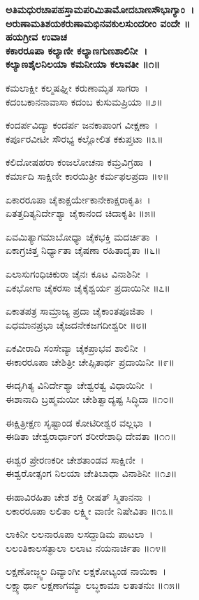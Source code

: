 {\bfseries ಅತಿಮಧುರಚಾಪಹಸ್ತಾಮಪರಿಮಿತಾಮೋದಬಾಣಸೌಭಾಗ್ಯಾಂ~।\\
ಅರುಣಾಮತಿಶಯಕರುಣಾಮಭಿನವಕುಲಸುಂದರೀಂ ವಂದೇ ॥\\
ಹಯಗ್ರೀವ ಉವಾಚ\\
ಕಕಾರರೂಪಾ ಕಲ್ಯಾಣೀ ಕಲ್ಯಾಣಗುಣಶಾಲಿನೀ~।\\
ಕಲ್ಯಾಣಶೈಲನಿಲಯಾ ಕಮನೀಯಾ ಕಲಾವತೀ ॥೧॥

ಕಮಲಾಕ್ಷೀ ಕಲ್ಮಷಘ್ನೀ ಕರುಣಾಮೃತ ಸಾಗರಾ~।\\
ಕದಂಬಕಾನನಾವಾಸಾ ಕದಂಬ ಕುಸುಮಪ್ರಿಯಾ ॥೨॥

ಕಂದರ್ಪವಿದ್ಯಾ ಕಂದರ್ಪ ಜನಕಾಪಾಂಗ ವೀಕ್ಷಣಾ~।\\
ಕರ್ಪೂರವೀಟೀ ಸೌರಭ್ಯ ಕಲ್ಲೋಲಿತ ಕಕುಪ್ತಟಾ ॥೩॥

ಕಲಿದೋಷಹರಾ ಕಂಜಲೋಚನಾ ಕಮ್ರವಿಗ್ರಹಾ~।\\
ಕರ್ಮಾದಿ ಸಾಕ್ಷಿಣೀ ಕಾರಯಿತ್ರೀ ಕರ್ಮಫಲಪ್ರದಾ ॥೪॥

ಏಕಾರರೂಪಾ ಚೈಕಾಕ್ಷರ್ಯೇಕಾನೇಕಾಕ್ಷರಾಕೃತಿಃ~।\\
ಏತತ್ತದಿತ್ಯನಿರ್ದೇಶ್ಯಾ ಚೈಕಾನಂದ ಚಿದಾಕೃತಿಃ ॥೫॥

ಏವಮಿತ್ಯಾಗಮಾಬೋಧ್ಯಾ ಚೈಕಭಕ್ತಿ ಮದರ್ಚಿತಾ~।\\
ಏಕಾಗ್ರಚಿತ್ತ ನಿರ್ಧ್ಯಾತಾ ಚೈಷಣಾ ರಹಿತಾದೃತಾ ॥೬॥

ಏಲಾಸುಗಂಧಿಚಿಕುರಾ ಚೈನಃ ಕೂಟ ವಿನಾಶಿನೀ~।\\
ಏಕಭೋಗಾ ಚೈಕರಸಾ ಚೈಕೈಶ್ವರ್ಯ ಪ್ರದಾಯಿನೀ ॥೭॥

ಏಕಾತಪತ್ರ ಸಾಮ್ರಾಜ್ಯ ಪ್ರದಾ ಚೈಕಾಂತಪೂಜಿತಾ~।\\
ಏಧಮಾನಪ್ರಭಾ ಚೈಜದನೇಕಜಗದೀಶ್ವರೀ ॥೮॥

ಏಕವೀರಾದಿ ಸಂಸೇವ್ಯಾ ಚೈಕಪ್ರಾಭವ ಶಾಲಿನೀ~।\\
ಈಕಾರರೂಪಾ ಚೇಶಿತ್ರೀ ಚೇಪ್ಸಿತಾರ್ಥ ಪ್ರದಾಯಿನೀ ॥೯॥

ಈದೃಗಿತ್ಯ ವಿನಿರ್ದೇಶ್ಯಾ ಚೇಶ್ವರತ್ವ ವಿಧಾಯಿನೀ~।\\
ಈಶಾನಾದಿ ಬ್ರಹ್ಮಮಯೀ ಚೇಶಿತ್ವಾದ್ಯಷ್ಟ ಸಿದ್ಧಿದಾ ॥೧೦॥

ಈಕ್ಷಿತ್ರೀಕ್ಷಣ ಸೃಷ್ಟಾಂಡ ಕೋಟಿರೀಶ್ವರ ವಲ್ಲಭಾ~।\\
ಈಡಿತಾ ಚೇಶ್ವರಾರ್ಧಾಂಗ ಶರೀರೇಶಾಧಿ ದೇವತಾ ॥೧೧॥

ಈಶ್ವರ ಪ್ರೇರಣಕರೀ ಚೇಶತಾಂಡವ ಸಾಕ್ಷಿಣೀ~।\\
ಈಶ್ವರೋತ್ಸಂಗ ನಿಲಯಾ ಚೇತಿಬಾಧಾ ವಿನಾಶಿನೀ ॥೧೨॥

ಈಹಾವಿರಹಿತಾ ಚೇಶ ಶಕ್ತಿ ರೀಷತ್ ಸ್ಮಿತಾನನಾ~।\\
ಲಕಾರರೂಪಾ ಲಲಿತಾ ಲಕ್ಷ್ಮೀ ವಾಣೀ ನಿಷೇವಿತಾ ॥೧೩॥

ಲಾಕಿನೀ ಲಲನಾರೂಪಾ ಲಸದ್ದಾಡಿಮ ಪಾಟಲಾ~।\\
ಲಲಂತಿಕಾಲಸತ್ಫಾಲಾ ಲಲಾಟ ನಯನಾರ್ಚಿತಾ ॥೧೪॥

ಲಕ್ಷಣೋಜ್ಜ್ವಲ ದಿವ್ಯಾಂಗೀ ಲಕ್ಷಕೋಟ್ಯಂಡ ನಾಯಿಕಾ~।\\
ಲಕ್ಷ್ಯಾರ್ಥಾ ಲಕ್ಷಣಾಗಮ್ಯಾ ಲಬ್ಧಕಾಮಾ ಲತಾತನುಃ ॥೧೫॥

}
